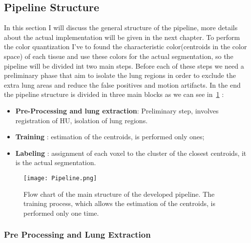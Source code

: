 \documentclass{standalone}
\begin{document}
	\subsection{Pipeline Structure}
	
	In this section I will discuss the general structure of the pipeline, more details about the actual implementation will be given in the next chapter.
	To perform the color quantization I've to found the characteristic color(centroids in the color space) of each tissue and use these colors for the actual segmentation, so the pipeline will be divided int two main steps. Before each of these steps we need a preliminary phase that aim to isolate the lung regions in order to exclude the extra lung areas and reduce the false positives and motion artifacts.
	In the end the pipeline structure is divided in three main blocks as we can see in \figurename\,\ref{fig:Pipeline} : 
	\begin{itemize}
		\item \textbf{Pre-Processing and lung extraction}: Preliminary step, involves registration of HU, isolation of lung regions.
		
		\item \textbf{Training} : estimation of the centroids, is performed only ones; 
		
		\item \textbf{Labeling} :  assignment of each voxel to the cluster of the closest centroids, it is the actual segmentation.
	\end{itemize}
	
		
	\begin{figure}[h!]
		\centering 
			\texttt{[image: Pipeline.png]}
		\caption{Flow chart of the main structure of the developed pipeline. The training process, which allows the estimation of the centroids, is performed only one time.}\label{fig:Pipeline}
	\end{figure} 
	
	\subsubsection*{Pre Processing and Lung Extraction}
	
\end{document}
